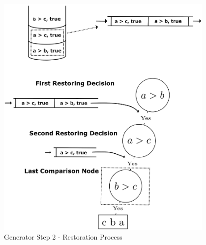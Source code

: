 \documentclass[final]{beamer}
\newlength{\onecolwid}
\newlength{\twocolwid}
\newlength{\onecolwidmid}
\begin{document}
\begin{frame}[t]
\begin{columns}[t]
\begin{column}{\twocolwid}
\begin{columns}[c,totalwidth=\twocolwid]
\begin{column}{\onecolwidmid}

\begin{figure}
\includegraphics[width=0.8\linewidth]{figures/bubble_sort_step_2_formatted.png}
\caption{Generator Step 2 - Restoration Process}
\label{generator:2}
\end{figure}


\end{column} %

\begin{column}{\onecolwidmid} %



\end{column}
\end{columns}
\end{column}
\end{columns}
\end{frame}
\end{document}
